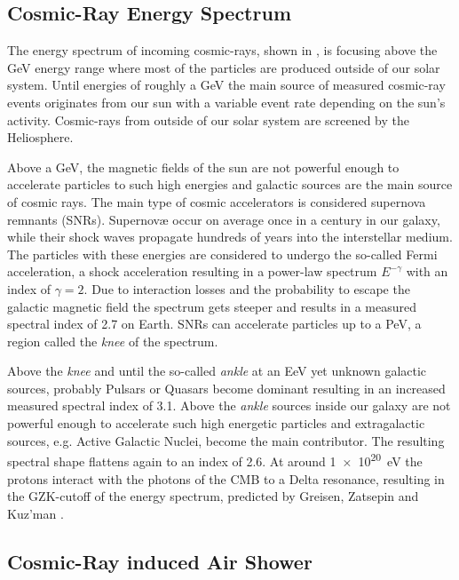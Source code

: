 \subsection{Cosmic-Ray Energy Spectrum}

The energy spectrum of incoming cosmic-rays, shown in , is focusing above the GeV energy range where most of the particles are produced outside of our solar system.
Until energies of roughly a GeV the main source of measured cosmic-ray events originates from our sun with a variable event rate depending on the sun's activity.
Cosmic-rays from outside of our solar system are screened by the Heliosphere.

Above a GeV, the magnetic fields of the sun are not powerful enough to accelerate particles to such high energies and galactic sources are the main source of cosmic rays.
The main type of cosmic accelerators is considered supernova remnants (SNRs).
Supernov\ae{} occur on average once in a century in our galaxy, while their shock waves propagate hundreds of years into the interstellar medium.
The particles with these energies are considered to undergo the so-called Fermi acceleration, a shock acceleration resulting in a power-law spectrum $E^{-\gamma}$ with an index of $\gamma = \num{2}$.
Due to interaction losses and the probability to escape the galactic magnetic field the spectrum gets steeper and results in a measured spectral index of \num{2.7} on Earth.
SNRs can accelerate particles up to a PeV, a region called the \textit{knee} of the spectrum.

Above the \textit{knee} and until the so-called \textit{ankle} at an EeV yet unknown galactic sources, probably Pulsars or Quasars become dominant resulting in an increased measured spectral index of \num{3.1}.
Above the \textit{ankle} sources inside our galaxy are not powerful enough to accelerate such high energetic particles and extragalactic sources, e.g. Active Galactic Nuclei, become the main contributor.
The resulting spectral shape flattens again to an index of \num{2.6}.
At around \SI{1e20}{eV} the protons interact with the photons of the CMB to a Delta resonance, resulting in the GZK-cutoff of the energy spectrum, predicted by Greisen, Zatsepin and Kuz'man \cite{Greisen66GZK, Zatsepin66GZK}.

\subsection{Cosmic-Ray induced Air Shower} \label{sec:air_shower}


